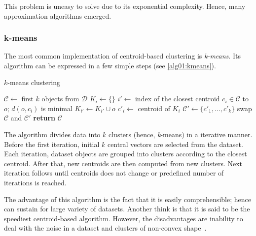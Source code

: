 This problem is uneasy to solve due to its exponential complexity. Hence, many approximation algorithms emerged. 

\subsubsection{k-means}

The most common implementation of centroid-based clustering is \emph{k-means}. Its algorithm can be expressed in a few simple steps (see \ref{alg01:kmeans}).

\begin{algorithm}
	\caption{$k$-means clustering}
	\label{alg01:kmeans}
	\begin{algorithmic}[1]
		\State $\mathcal{C} \gets$ first $k$ objects from  $\mathcal{D}$ 
		\Repeat
				\State $K_i \gets \{\}$
			\EndFor
				\State $i' \gets$ index of the closest centroid $c_i \in \mathcal{C}$ to $o$; $d(o,c_i)$ is minimal
				\State $K_{i'} \gets K_{i'} \cup o$ 
			\EndFor
				\State $c'_i \gets$ centroid of $K_i$ 
			\EndFor
			\State $\mathcal{C}' \gets \{c'_1,\dots,c'_k\}$
			\State swap $\mathcal{C}$ and $\mathcal{C}'$
		\State \textbf{return} $\mathcal{C}$
		\EndProcedure
	\end{algorithmic}
\end{algorithm}


The algorithm divides data into $k$ clusters (hence, \emph{k}-means) in a iterative manner. Before the first iteration, initial $k$ central vectors are selected from the dataset. Each iteration, dataset objects are grouped into clusters according to the closest centroid. After that, new centroids are then computed from new clusters. Next iteration follows until centroids does not change or predefined number of iterations is reached. 

The advantage of this algorithm is the fact that it is easily comprehensible; hence can sustain for large variety of datasets. Another think is that it is said to be the speediest centroid-based algorithm. However, the disadvantages are inability to deal with the noise in a dataset and clusters of non-convex shape~\cite{uppada2014centroid}.
  

